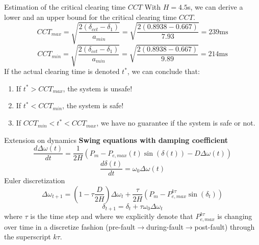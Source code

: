 \begin{frame}[allowframebreaks]{Estimation of the critical clearing time $CCT$}
With $H = 4.5$s, we can derive a lower and an upper bound for the critical clearing time $CCT$.
$$CCT_{max} = \sqrt{\frac{2\left(\delta_{cct}-\delta_{1}\right)}{a_{min}}} = \sqrt{\frac{2\left(0.8938-0.667\right)}{7.93}} = 239 \text{ms}$$
$$CCT_{min} = \sqrt{\frac{2\left(\delta_{cct}-\delta_{1}\right)}{a_{min}}} = \sqrt{\frac{2\left(0.8938-0.667\right)}{9.89}} = 214 \text{ms}$$
If the actual clearing time is denoted $t^*$, we can conclude that:
\begin{enumerate}
    \item If $t^*>CCT_{max}$, the system is unsafe!
    \item If $t^*<CCT_{min}$, the system is safe!
    \item If $CCT_{min}<t^*<CCT_{max}$, we have no guarantee if the system is safe or not.
\end{enumerate}
\end{frame}

\begin{frame} {Extension on dynamics}
\textbf{Swing equations with damping coefficient}
$$\frac{d\Delta \omega(t)}{dt} = \frac{1}{2H}\left(P_m - P_{e,max}(t) \sin (\delta(t)) - D \Delta \omega(t) \right)$$
$$\frac{d\delta(t)}{dt} = \omega_0 \Delta \omega(t)$$
Euler discretization
$$\Delta \omega_{t+1} = (1-\tau \frac{D}{2H})\Delta \omega_{t} + \frac{\tau}{2H}\left(P_m-P_{e,max}^{k \tau}\sin (\delta_{t})\right)$$
$$\delta_{t+1} = \delta_{t} + \tau\omega_0\Delta \omega_t$$
where $\tau$ is the time step and where we explicitly denote that $P_{e,max}^{k \tau}$ is changing over time in a discretize fashion (pre-fault$\rightarrow$during-fault$\rightarrow$post-fault) through the superscript $k \tau$.
\end{frame}

